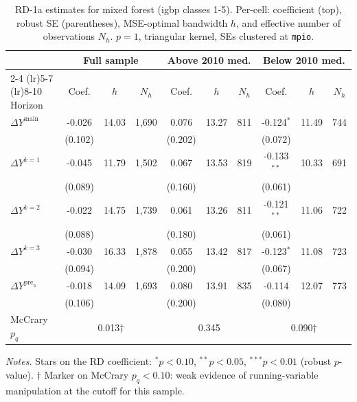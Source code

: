 \documentclass[11pt]{article}
\begin{document}
\begin{table}[H]
\centering
\scriptsize
\caption{RD-1a estimates for mixed forest (igbp classes 1-5). Per-cell: coefficient
(top), robust SE (parentheses), MSE-optimal bandwidth $h$, and
effective number of observations $N_h$. $p=1$, triangular kernel,
SEs clustered at \texttt{mpio}.}
\label{tab:rdplot_rd1a_mixed_forest}
\begin{tabular}{l ccc ccc ccc}
\toprule
 & \multicolumn{3}{c}{Full sample} & \multicolumn{3}{c}{Above 2010 med.} & \multicolumn{3}{c}{Below 2010 med.} \\
\cmidrule(lr){2-4} \cmidrule(lr){5-7} \cmidrule(lr){8-10}
Horizon & Coef. & $h$ & $N_h$ & Coef. & $h$ & $N_h$ & Coef. & $h$ & $N_h$ \\
\midrule
$\Delta Y^{\text{main}}$ & -0.026 & 14.03 & 1,690 & 0.076 & 13.27 & 811 & -0.124$^{*}$ & 11.49 & 744 \\
 & (0.102) &  &  & (0.202) &  &  & (0.072) &  &  \\
\addlinespace[1pt]
$\Delta Y^{k=1}$ & -0.045 & 11.79 & 1,502 & 0.067 & 13.53 & 819 & -0.133$^{**}$ & 10.33 & 691 \\
 & (0.089) &  &  & (0.160) &  &  & (0.061) &  &  \\
\addlinespace[1pt]
$\Delta Y^{k=2}$ & -0.022 & 14.75 & 1,739 & 0.061 & 13.26 & 811 & -0.121$^{**}$ & 11.06 & 722 \\
 & (0.088) &  &  & (0.180) &  &  & (0.061) &  &  \\
\addlinespace[1pt]
$\Delta Y^{k=3}$ & -0.030 & 16.33 & 1,878 & 0.055 & 13.42 & 817 & -0.123$^{*}$ & 11.08 & 723 \\
 & (0.094) &  &  & (0.200) &  &  & (0.067) &  &  \\
\addlinespace[1pt]
$\Delta Y^{\text{pre}_3}$ & -0.018 & 14.09 & 1,693 & 0.080 & 13.91 & 835 & -0.114 & 12.07 & 773 \\
 & (0.106) &  &  & (0.200) &  &  & (0.080) &  &  \\
\addlinespace[1pt]
\midrule
McCrary $p_q$ & \multicolumn{3}{c}{0.013$\dagger$} & \multicolumn{3}{c}{0.345} & \multicolumn{3}{c}{0.090$\dagger$} \\
\bottomrule
\end{tabular}
\begin{flushleft}\footnotesize
\textit{Notes.} Stars on the RD coefficient: $^{*}p<0.10$,
$^{**}p<0.05$, $^{***}p<0.01$ (robust $p$-value).
$\dagger$ Marker on McCrary $p_q<0.10$: weak evidence of running-variable manipulation at the cutoff for this sample.\\
\end{flushleft}
\end{table}
\end{document}
